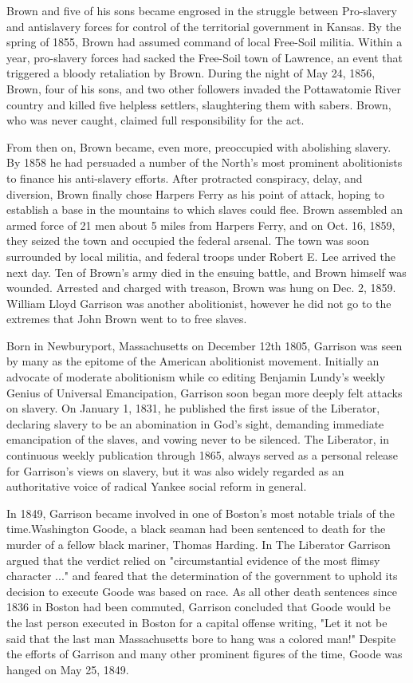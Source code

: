 \documentclass[a4paper]{article}
\begin{document}
Brown and five of his sons became engrosed in the struggle between Pro-slavery and antislavery forces for control of the territorial government in Kansas. By the spring of 1855, Brown had assumed command of local Free-Soil militia. Within a year, pro-slavery forces had sacked the Free-Soil town of Lawrence, an event that triggered a bloody retaliation by Brown. During the night of May 24, 1856, Brown, four of his sons, and two other followers invaded the Pottawatomie River country and killed five helpless settlers, slaughtering them with sabers. Brown, who was never caught, claimed full responsibility for the act.

From then on, Brown became, even more, preoccupied with abolishing slavery. By 1858 he had persuaded a number of the North's most prominent abolitionists to finance his anti-slavery efforts. After protracted conspiracy, delay, and diversion, Brown finally chose Harpers Ferry as his point of attack, hoping to establish a base in the mountains to which slaves could flee. Brown assembled an armed force of 21 men about 5 miles from Harpers Ferry, and on Oct. 16, 1859, they seized the town and occupied the federal arsenal. The town was soon surrounded by local militia, and federal troops under Robert E. Lee arrived the next day. Ten of Brown's army died in the ensuing battle, and Brown himself was wounded. Arrested and charged with treason, Brown was hung on Dec. 2, 1859. William Lloyd Garrison was another abolitionist, however he did not go to the extremes that John Brown went to to free slaves. 


Born in Newburyport, Massachusetts on December 12th 1805, Garrison was seen by many as the epitome of the American abolitionist movement. Initially an advocate of moderate abolitionism while co editing Benjamin Lundy's weekly Genius of Universal Emancipation, Garrison soon began more deeply felt attacks on slavery. On January 1, 1831, he published the first issue of the Liberator, declaring slavery to be an abomination in God's sight, demanding immediate emancipation of the slaves, and vowing never to be silenced. The Liberator, in continuous weekly publication through 1865, always served as a personal release for Garrison's views on slavery, but it was also widely regarded as an authoritative voice of radical Yankee social reform in general.

In 1849, Garrison became involved in one of Boston's most notable trials of the time.Washington Goode, a black seaman had been sentenced to death for the murder of a fellow black mariner, Thomas Harding. In The Liberator Garrison argued that the verdict relied on "circumstantial evidence of the most flimsy character ..." and feared that the determination of the government to uphold its decision to execute Goode was based on race. As all other death sentences since 1836 in Boston had been commuted, Garrison concluded that Goode would be the last person executed in Boston for a capital offense writing, "Let it not be said that the last man Massachusetts bore to hang was a colored man!" Despite the efforts of Garrison and many other prominent figures of the time, Goode was hanged on May 25, 1849.
\end{document}
